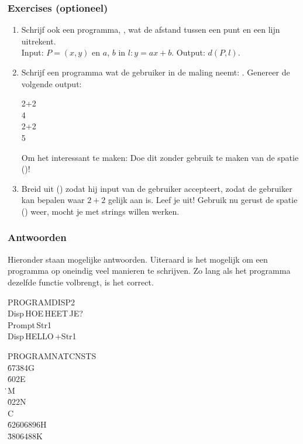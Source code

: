 \begin{frame}
\frametitle{Exercises (optioneel)}

\begin{enumerate}
  \item Schrijf ook een programma, , wat de afstand tussen een punt en een lijn uitrekent. \\
  		Input: $P=(x,y)$ en $a$, $b$ in $l:y=ax+b$. Output: $d(P,l)$.
  \item Schrijf een programma wat de gebruiker in de maling neemt: .
  		Genereer de volgende output: \\
		\begin{ticalc}[3.25cm]
			2+2\\
			\hfill 4\\
			2+2\\
			\hfill 5
		\end{ticalc}
		
		Om het interessant te maken: Doe dit zonder gebruik te maken van de spatie (\tiSpace)!
  \item Breid  uit () zodat hij input van de gebruiker accepteert, zodat de gebruiker kan bepalen waar $2+2$ gelijk aan is. Leef je uit!
  		Gebruik nu gerust de spatie (\tiSpace) weer, mocht je met strings willen werken.
\end{enumerate}

\end{frame}

\begin{frame}
\frametitle{Antwoorden}

Hieronder staan mogelijke antwoorden.
Uiteraard is het mogelijk om een programma op oneindig veel manieren te schrijven.
Zo lang als het programma dezelfde functie volbrengt, is het correct.

\vspace{0.3cm}

\begin{ticalc}[5cm]
	PROGRAM\:DISP2 \\%
	\:Disp\,\qt HOE\,HEET\,JE?\qt\\%
	\:Prompt\,Str1\\%
	\:Disp\,\qt HELLO\,\qt+Str1
\end{ticalc}

\vspace{0.3cm}

\begin{ticalc}[5cm]
	PROGRAM\:NATCNSTS \\%
	\.67384\E\min\one\one\>G\\%
	\:\one\.602\E\min{}\>E\\%
	\.\E{}\one\>M\\%
	\.022\E{}\>N\\%
	\>C\\%
	\.62606896\E{}\>H\\%
	\:\one\.3806488\E{}\>K%
\end{ticalc}

\end{frame}

